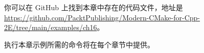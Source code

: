 
你可以在 GitHub 上找到本章中存在的代码文件，地址是 \url{https://github.com/PacktPublishing/Modern-CMake-for-Cpp-2E/tree/main/examples/ch16}。

执行本章示例所需的命令将在每个章节中提供。